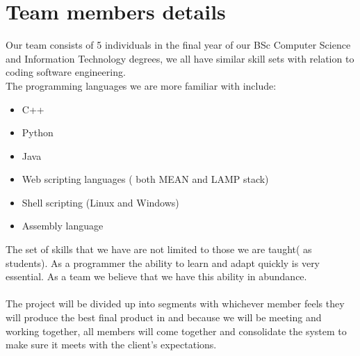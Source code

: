 \documentclass[runningheads,a4paper]{article}
\begin{document}
  \section{Team members details}%
  Our team consists of 5 individuals in the final year of our BSc Computer Science and Information Technology degrees, we all have similar skill sets with relation to coding software engineering. \\
	The programming languages we are more familiar with include: \\
	\begin{itemize}
      \item C++
      \item Python
      \item Java
      \item Web scripting languages ( both MEAN and LAMP stack)
      \item Shell scripting (Linux and Windows) 
      \item Assembly language\\
    \end{itemize}
     
    The set of skills that we have are not limited to those we are taught( as students). As a programmer the ability to learn and adapt quickly is very essential. As a team we believe that we have this ability in abundance. \\
	
	\\The project will be divided up into segments with whichever member feels they will produce the best final product in and because we will be meeting and working together, all members will come together and consolidate the system to make sure it meets with the client's expectations.\\


  
  
\end{document}
